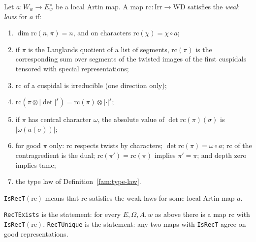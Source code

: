 \begin{definition}\label{fam:laws-t}
Let $a\colon W_w\to E_w^{\times}$ be a local Artin map. A map $\mathrm{rc}\colon\mathrm{Irr}\to\mathrm{WD}$ satisfies the \emph{weak laws} for $a$ if:
\begin{enumerate}
\item $\dim\mathrm{rc}(n,\pi)=n$, and on characters $\mathrm{rc}(\chi)=\chi\circ a$;
\item if $\pi$ is the Langlands quotient of a list of segments, $\mathrm{rc}(\pi)$ is the corresponding sum over segments of the twisted images of the first cuspidals tensored with special representations;
\item $\mathrm{rc}$ of a cuspidal is irreducible (one direction only);
\item $\mathrm{rc}(\pi\otimes|\det|^s)=\mathrm{rc}(\pi)\otimes|\cdot|^s$;
\item if $\pi$ has central character $\omega$, the absolute value of $\det\mathrm{rc}(\pi)(\sigma)$ is $|\omega(a(\sigma))|$;
\item for good $\pi$ only: $\mathrm{rc}$ respects twists by characters; $\det\mathrm{rc}(\pi)=\omega\circ a$; $\mathrm{rc}$ of the contragredient is the dual; $\mathrm{rc}(\pi')=\mathrm{rc}(\pi)$ implies $\pi'=\pi$; and depth zero implies tame;
\item the type law of Definition~\ref{fam:type-law}.
\end{enumerate}
\texttt{IsRecT}$(\mathrm{rc})$ means that $\mathrm{rc}$ satisfies the weak laws for some local Artin map $a$.
\end{definition}

\begin{definition}\label{fam:rect-exists}
\texttt{RecTExists} is the statement: for every $E,\Omega,A,w$ as above there is a map $\mathrm{rc}$ with \texttt{IsRecT}$(\mathrm{rc})$. \texttt{RecTUnique} is the statement: any two maps with \texttt{IsRecT} agree on good representations.
\end{definition}

